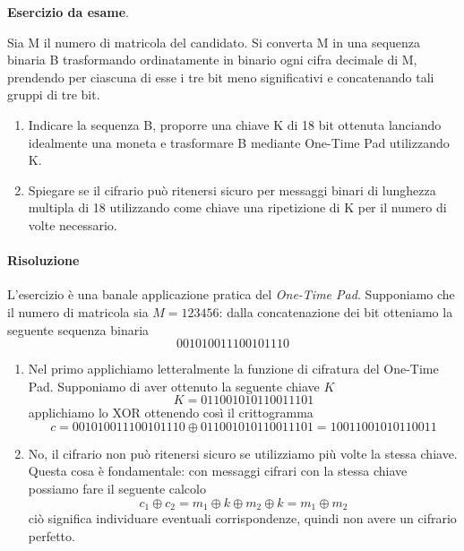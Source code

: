 \begin{framed}
	\noindent \textbf{Esercizio da esame}.
	
	\noindent Sia M il numero di matricola del candidato. Si converta M in una sequenza binaria B trasformando
	ordinatamente in binario ogni cifra decimale di M, prendendo per ciascuna di esse i tre bit meno
	significativi e concatenando tali gruppi di tre bit. 
	\begin{enumerate}
		\item Indicare la sequenza B, proporre una chiave K di 18 bit ottenuta lanciando idealmente una
		moneta e trasformare B mediante One-Time Pad utilizzando K.
		\item  Spiegare se il cifrario può ritenersi sicuro per messaggi binari di lunghezza multipla di 18
		utilizzando come chiave una ripetizione di K per il numero di volte necessario.
	\end{enumerate}
	
	\paragraph{Risoluzione} L'esercizio è una banale applicazione pratica del \emph{One-Time Pad}. Supponiamo che il numero di matricola sia $M=123456$: dalla concatenazione dei bit otteniamo la seguente sequenza binaria
	$$\text{001010011100101110}$$
	\begin{enumerate}
		\item Nel primo applichiamo letteralmente la funzione di cifratura del One-Time Pad. Supponiamo di aver ottenuto la seguente chiave $K$
		$$K=011001010110011101$$
		applichiamo lo XOR ottenendo così il crittogramma
		$$c=001010011100101110 \oplus 011001010110011101=10011001010110011$$
		\item No, il cifrario non può ritenersi sicuro se utilizziamo più volte la stessa chiave. Questa cosa è fondamentale: con messaggi cifrari con la stessa chiave possiamo fare il seguente calcolo
		$$ c_1 \oplus c_2 = m_1 \oplus k \oplus m_2 \oplus k = m_1 \oplus m_2 $$
		ciò significa individuare eventuali corrispondenze, quindi non avere un cifrario perfetto.
	\end{enumerate}
\end{framed}



